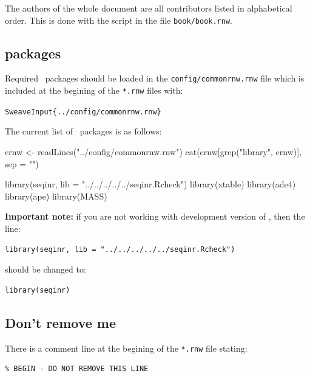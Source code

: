 \documentclass{article}
\begin{document}
The authors of the whole document are all contributors listed
in alphabetical order. This is done with the script in the file
\texttt{book/book.rnw}.

\subsection{\Rlogo{} packages}

Required \Rlogo{}~packages should be loaded in the 
\texttt{config/commonrnw.rnw} file which is included
at the begining of the \texttt{*.rnw} files with:


\vspace{0.2cm}
\noindent\texttt{SweaveInput\{../config/commonrnw.rnw\}}
\vspace{0.2cm}

The current list of \Rlogo{}~packages is as follows:

\begin{Schunk}
\begin{Sinput}
 crnw <- readLines("../config/commonrnw.rnw")
 cat(crnw[grep("library", crnw)], sep = "\n")
\end{Sinput}
\begin{Soutput}
library(seqinr, lib = "../../../../../seqinr.Rcheck")
library(xtable)
library(ade4)
library(ape)
library(MASS)
\end{Soutput}
\end{Schunk}

\textbf{Important note:} if you are not working with development 
version of \seqinr{}, then the line:

\begin{verbatim}
library(seqinr, lib = "../../../../../seqinr.Rcheck")
\end{verbatim}

should be changed to:

\begin{verbatim}
library(seqinr)
\end{verbatim}

\subsection{Don't remove me}

There is a comment line at the begining of the \texttt{*.rnw} file stating:

\begin{verbatim}
% BEGIN - DO NOT REMOVE THIS LINE
\end{verbatim}
\end{document}
